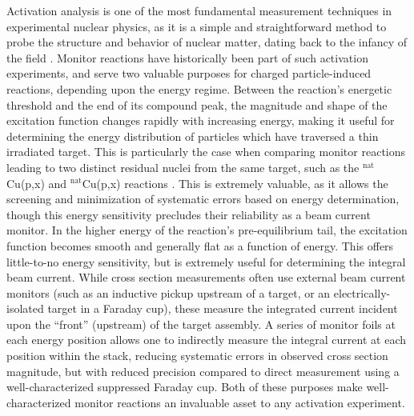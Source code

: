\documentclass[3p]{elsarticle}
\newcommand{\comment}[1]{\todo[color=blue!20!white,inline]{ASV: #1}}
\begin{document}
Activation analysis is one of the most fundamental measurement techniques in experimental nuclear physics, as it is a simple and straightforward method to probe the structure and behavior of nuclear matter,  dating back to the infancy of the field \cite{ehmann1993radiochemistry,krüger1971principles}. 
Monitor reactions have  historically been part of such activation experiments, and serve two valuable purposes for charged particle-induced reactions, depending upon the energy regime.  
Between the reaction's energetic threshold  and the end of its compound peak, the magnitude and shape of the excitation function changes rapidly with increasing energy, making it useful for determining the energy distribution of particles which have traversed a thin irradiated target.
This is particularly the case when comparing  monitor reactions leading to two distinct residual nuclei from the same target, such as the $^\text{nat}$Cu(p,x) and $^\text{nat}$Cu(p,x) reactions \cite{gul2001charged}.
This is extremely valuable, as it allows the screening and minimization of systematic errors based on energy determination, though this energy sensitivity  precludes their reliability as a beam current monitor.  
In the higher energy  of the reaction's pre-equilibrium tail, the excitation function becomes  smooth and generally flat as a function of energy.
This  offers little-to-no energy sensitivity, but  is extremely useful for determining the integral beam current. 
While cross section measurements often use external beam current monitors (such as an inductive pickup upstream of a target, or an electrically-isolated target in a Faraday cup), these measure the integrated current incident upon the \enquote{front} (upstream) of the target assembly.
A series of monitor foils at each energy position allows one to indirectly measure the integral current at each position within the stack, reducing systematic errors in observed cross section magnitude, but with reduced precision compared to direct measurement using a well-characterized suppressed Faraday cup.
Both of these purposes make well-characterized monitor reactions an invaluable asset to any activation experiment. 
\end{document}
